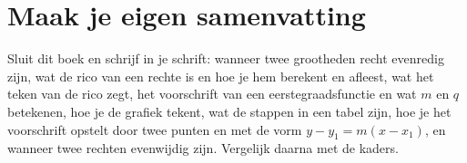 \begin{oefeningen}























\end{oefeningen}


\begin{oefeningen}






\end{oefeningen}


\ifzelfstudie
\section*{Maak je eigen samenvatting}
Sluit dit boek en schrijf in je schrift: wanneer twee grootheden recht evenredig zijn, wat de rico van een rechte is en hoe je hem berekent en afleest, wat het teken van de rico zegt, het voorschrift van een eerstegraadsfunctie en wat $m$ en $q$ betekenen, hoe je de grafiek tekent, wat de stappen in een tabel zijn, hoe je het voorschrift opstelt door twee punten en met de vorm $y - y_1 = m(x - x_1)$, en wanneer twee rechten evenwijdig zijn. Vergelijk daarna met de kaders.
\fi
